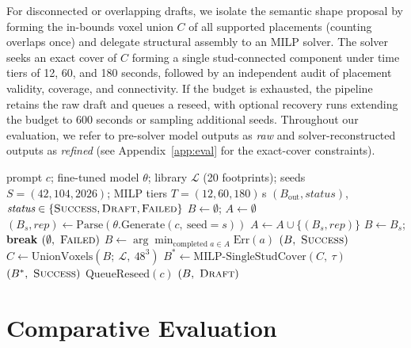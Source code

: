 \documentclass[letterpaper]{article} %
\begin{document}
For disconnected or overlapping drafts, we isolate the semantic shape proposal by forming the in-bounds voxel union $C$ of all supported placements (counting overlaps once) and delegate structural assembly to an MILP solver. The solver seeks an exact cover of $C$ forming a single stud-connected component under time tiers of 12, 60, and 180 seconds, followed by an independent audit of placement validity, coverage, and connectivity. If the budget is exhausted, the pipeline retains the raw draft and queues a reseed, with optional recovery runs extending the budget to 600 seconds or sampling additional seeds. Throughout our evaluation, we refer to pre-solver model outputs as \emph{raw} and solver-reconstructed outputs as \emph{refined} (see Appendix~\ref{app:eval} for the exact-cover constraints).
\begin{algorithm}[tb]
\caption{BrickForma inference and refinement}
\label{alg:inference-refinement}
\small
\begin{algorithmic}[1]
\REQUIRE prompt $c$; fine-tuned model $\theta$; library $\mathcal{L}$ (20 footprints); seeds $S=(42,104,2026)$; MILP tiers $T=(12,60,180)$\,s
\ENSURE $(B_{\mathrm{out}}, \textit{status})$, $\textit{status}\in\{\textsc{Success},\textsc{Draft},\textsc{Failed}\}$
\STATE $B \gets \emptyset$; $A \gets \emptyset$
  \STATE $(B_s,\textit{rep}) \gets \mathrm{Parse}(\theta.\mathrm{Generate}(c,\ \mathrm{seed}{=}s))$
  \STATE $A \gets A \cup \{(B_s,\textit{rep})\}$
    \STATE $B \gets B_s$; \textbf{break}
  \ENDIF
\ENDFOR
{}
    \RETURN $(\emptyset,\ \textsc{Failed})$
  \ENDIF
  \STATE $B \gets \arg\min_{\text{completed } a\in A} \mathrm{Err}(a)$
\ENDIF
{}
  \RETURN $(B,\ \textsc{Success})$ 
\ENDIF
\STATE $C \gets \mathrm{UnionVoxels}(B;\ \mathcal{L},\ 48^3)$ 
  \STATE $B^{*} \gets \mathrm{MILP\text{-}SingleStudCover}(C,\ \tau)$
    \RETURN $(B^{*},\ \textsc{Success})$
  \ENDIF
\ENDFOR
\STATE $\mathrm{QueueReseed}(c)$
\RETURN $(B,\ \textsc{Draft})$ 
\end{algorithmic}
\end{algorithm}
\section{Comparative Evaluation}
\label{sec:eval}
\end{document}
